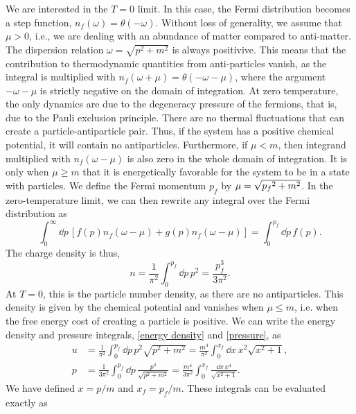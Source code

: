 We are interested in the $T = 0$ limit.
In this case, the Fermi distribution becomes a step function, $n_f(\omega) = \theta(-\omega)$.
Without loss of generality, we assume that $\mu > 0$, i.e., we are dealing with an abundance of matter compared to anti-matter.
The dispersion relation $\omega = \sqrt{p^2 + m^2}$ is always positivive.
This means that the contribution to thermodynamic quantities from anti-particles vanish, as the integral is multiplied with $n_f(\omega + \mu) = \theta(-\omega - \mu)$, where the argument $-\omega - \mu$ is strictly negative on the domain of integration.
At zero temperature, the only dynamics are due to the degeneracy pressure of the fermions, that is, due to the Pauli exclusion principle.
There are no thermal fluctuations that can create a particle-antiparticle pair.
Thus, if the system has a positive chemical potential, it will contain no antiparticles.
Furthermore, if $\mu< m$, then integrand multiplied with $n_f(\omega - \mu)$ is also zero in the whole domain of integration.
It is only when $\mu\geq m$ that it is energetically favorable for the system to be in a state with particles.
We define the Fermi momentum $p_f$ by $\mu = \sqrt{\smash{p_f}^2 + m^2}$. 
In the zero-temperature limit, we can then rewrite any integral over the Fermi distribution as
%
%
\begin{equation}
    \int_0^\infty \dd p \, [f(p) n_f(\omega - \mu) + g(p) n_f(\omega - \mu)]= \int_0^{p_f} \dd p \, f(p).
\end{equation}
%
The charge density is thus,
%
\begin{equation}
    n = \frac{1}{\pi^2} \int_0^{p_f} \dd p\, p^2 = \frac{p_f^3}{3 \pi^2}.
\end{equation}
%
At $T = 0$, this is the particle number density, as there are no antiparticles.
This density is given by the chemical potential and vanishes when $\mu \leq m$, i.e. when the free energy cost of creating a particle is positive.
We can write the energy density and pressure integrals, \autoref{energy density} and \autoref{pressure}, as
%
\begin{align}
    u &= \frac{1}{\pi^2} \int_0^{p_f} \dd p \,
    p^2 \sqrt{p^2 + m^2}
    = \frac{m^4}{\pi^2} \int_0^{x_f} \dd x \, x^2 \sqrt{x^2 + 1}, \\
    p & = \frac{1}{3 \pi^2} \int_0^{p_f} \dd p \,  \frac{p^4}{\sqrt{p^2 + m^2}} 
    = \frac{m^4}{3 \pi^2} \int_0^{x_f} \frac{\dd x \, x^4}{\sqrt{x^2 + 1}}.
\end{align}
% 
We have defined $x = p / m$ and $x_f = p_f/m$.
These integrals can be evaluated exactly as
